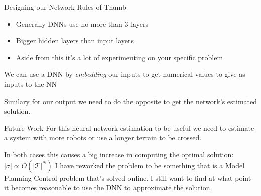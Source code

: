 \documentclass[aspectratio=169, 10pt]{beamer} %
\begin{document}
\begin{frame}{Designing our Network}
    Rules of Thumb \begin{itemize}
      \item Generally DNNs use no more than 3 layers \par
      \item Bigger hidden layers than input layers \par
      \item Aside from this it's a lot of experimenting on your specific problem
    \end{itemize}
    \par
    We can use a DNN by \textit{embedding} our inputs to get numerical values to give as inputs to the NN\par
    Similary for our output we need to do the opposite to get the network's estimated solution.
\end{frame}
\begin{frame}{Future Work}
    For this neural network estimation to be useful we need to estimate a system with more robots or use a longer terrain to be crossed. \par
    In both cases this causes a big increase in computing the optimal solution: $|\sigma| \propto O(|\mathcal{T}|^N)$
    I have reworked the problem to be something that is a Model Planning Control problem that's solved online. I still want to find at what point it becomes reasonable to use the DNN to approximate the solution.
\end{frame}
\end{document}
